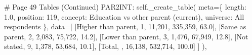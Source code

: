 \documentclass[
  11pt,
  a4paper,
]{article}
\newenvironment{Shaded}{\begin{snugshade}}{\end{snugshade}}
\newcommand{\CommentTok}[1]{\textcolor[rgb]{0.37,0.37,0.37}{#1}}
\newcommand{\NormalTok}[1]{\textcolor[rgb]{0.00,0.23,0.31}{#1}}
\newcommand{\OperatorTok}[1]{\textcolor[rgb]{0.37,0.37,0.37}{#1}}
\newcommand{\StringTok}[1]{\textcolor[rgb]{0.13,0.47,0.30}{#1}}
\newcommand{\VariableTok}[1]{\textcolor[rgb]{0.07,0.07,0.07}{#1}}
\begin{document}
\begin{Shaded}
\begin{Highlighting}[]
    \CommentTok{\# Page 49 Tables (Continued)}
    \StringTok{\textquotesingle{}PAR2INT\textquotesingle{}}\NormalTok{: }\VariableTok{self}\NormalTok{.\_create\_table(}
\NormalTok{        meta}\OperatorTok{=}\NormalTok{\{}
            \StringTok{\textquotesingle{}length\textquotesingle{}}\NormalTok{: }\StringTok{\textquotesingle{}1.0\textquotesingle{}}\NormalTok{, }\StringTok{\textquotesingle{}position\textquotesingle{}}\NormalTok{: }\StringTok{\textquotesingle{}119\textquotesingle{}}\NormalTok{,}
            \StringTok{\textquotesingle{}concept\textquotesingle{}}\NormalTok{: }\StringTok{\textquotesingle{}Education vs other parent (current)\textquotesingle{}}\NormalTok{,}
            \StringTok{\textquotesingle{}universe\textquotesingle{}}\NormalTok{: }\StringTok{\textquotesingle{}All respondents\textquotesingle{}}
\NormalTok{        \},}
\NormalTok{        data}\OperatorTok{=}\NormalTok{[}
\NormalTok{            [}\StringTok{\textquotesingle{}Higher than parent\textquotesingle{}}\NormalTok{, }\StringTok{\textquotesingle{}1\textquotesingle{}}\NormalTok{, }\StringTok{\textquotesingle{}11,201\textquotesingle{}}\NormalTok{, }\StringTok{\textquotesingle{}335,359\textquotesingle{}}\NormalTok{, }\StringTok{\textquotesingle{}63.0\textquotesingle{}}\NormalTok{],}
\NormalTok{            [}\StringTok{\textquotesingle{}Same as parent\textquotesingle{}}\NormalTok{, }\StringTok{\textquotesingle{}2\textquotesingle{}}\NormalTok{, }\StringTok{\textquotesingle{}2,083\textquotesingle{}}\NormalTok{, }\StringTok{\textquotesingle{}75,722\textquotesingle{}}\NormalTok{, }\StringTok{\textquotesingle{}14.2\textquotesingle{}}\NormalTok{],}
\NormalTok{            [}\StringTok{\textquotesingle{}Lower than parent\textquotesingle{}}\NormalTok{, }\StringTok{\textquotesingle{}3\textquotesingle{}}\NormalTok{, }\StringTok{\textquotesingle{}1,476\textquotesingle{}}\NormalTok{, }\StringTok{\textquotesingle{}67,949\textquotesingle{}}\NormalTok{, }\StringTok{\textquotesingle{}12.8\textquotesingle{}}\NormalTok{],}
\NormalTok{            [}\StringTok{\textquotesingle{}Not stated\textquotesingle{}}\NormalTok{, }\StringTok{\textquotesingle{}9\textquotesingle{}}\NormalTok{, }\StringTok{\textquotesingle{}1,378\textquotesingle{}}\NormalTok{, }\StringTok{\textquotesingle{}53,684\textquotesingle{}}\NormalTok{, }\StringTok{\textquotesingle{}10.1\textquotesingle{}}\NormalTok{],}
\NormalTok{            [}\StringTok{\textquotesingle{}Total\textquotesingle{}}\NormalTok{, }\StringTok{\textquotesingle{}\textquotesingle{}}\NormalTok{, }\StringTok{\textquotesingle{}16,138\textquotesingle{}}\NormalTok{, }\StringTok{\textquotesingle{}532,714\textquotesingle{}}\NormalTok{, }\StringTok{\textquotesingle{}100.0\textquotesingle{}}\NormalTok{]}
\NormalTok{        ]}
\NormalTok{    ),}


\end{Highlighting}
\end{Shaded}
\end{document}
